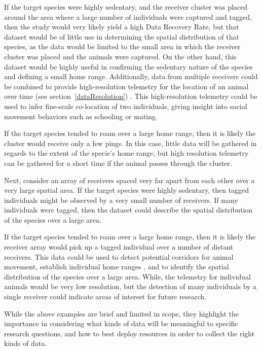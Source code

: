 If the target species were highly sedentary, and the receiver cluster was placed around the area where a large number of individuals were captured and tagged, then the study would very likely yield a high Data Recovery Rate, but that dataset would be of little use in determining the spatial distribution of that species, as the data would be limited to the small area in which the receiver cluster was placed and the animals were captured.  On the other hand, this dataset would be highly useful in confirming the sedentary nature of the species and defining a small home range.  Additionally, data from multiple receivers could be combined to provide high-resolution telemetry for the location of an animal over time (see section~\ref{dataResolution}) \cite{Heupel2006}.  This high-resolution telemetry could be used to infer fine-scale co-location of two individuals, giving insight into social movement behaviors such as schooling or mating.  

If the target species tended to roam over a large home range, then it is likely the cluster would receive only a few pings.  In this case, little data will be gathered in regards to the extent of the specie's home range, but high resolution telemetry can be gathered for a short time if the animal passes through the cluster.

Next, consider an array of receivers spaced very far apart from each other over a very large spatial area.
If the target species were highly sedentary, then tagged individuals might be observed by a very small number of receivers.  If many individuals were tagged, then the dataset could describe the spatial distribution of the species over a large area.

If the target species tended to roam over a large home range, then it is likely the receiver array would pick up a tagged individual over a number of distant receivers.  This data could be used to detect potential corridors for animal movement, establish individual home ranges \cite{statespacemodel}, and to identify the spatial distribution of the species over a large area.  While, the telemetry for individual animals would be very low resolution, but the detection of many individuals by a single receiver could indicate areas of interest for future research.

While the above examples are brief and limited in scope, they highlight the importance in considering what kinds of data will be meaningful to specific research questions, and how to best deploy resources in order to collect the right kinds of data.
